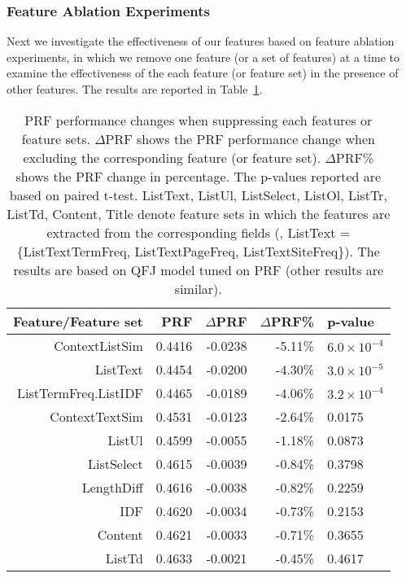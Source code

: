\subsubsection{Feature Ablation Experiments}
Next we investigate the effectiveness of our features based on feature ablation experiments, in which we remove one feature (or a set of features) at a time to examine the effectiveness of the each feature (or feature set) in the presence of other features. The results are reported in Table~\ref{tab:intrinsic-ablation}.
\begin{table}[!ht]
\centering
\caption{PRF performance changes when suppressing each features or feature sets. $\Delta$PRF shows the PRF performance change when excluding the corresponding feature (or feature set). $\Delta$PRF\% shows the PRF change in percentage. The p-values reported are based on paired t-test. ListText, ListUl, ListSelect, ListOl, ListTr, ListTd, Content, Title denote feature sets in which the features are extracted from the corresponding fields (\eg, ListText = \{ListTextTermFreq, ListTextPageFreq, ListTextSiteFreq\}). 
The results are based on QFJ model tuned on PRF (other results are similar).}
\label{tab:intrinsic-ablation}
\begin{tabular}{|r|r|r|r|l|} \hline
Feature/Feature set & PRF & $\Delta$PRF & $\Delta$PRF\% & p-value\\ \hline
ContextListSim & 0.4416 & -0.0238 & -5.11\% & $6.0\times10^{-4}$ \\ \hline
ListText & 0.4454 & -0.0200 & -4.30\% & $3.0\times10^{-5}$ \\ \hline
ListTermFreq.ListIDF & 0.4465 & -0.0189 & -4.06\% & $3.2\times10^{-4}$ \\ \hline
ContextTextSim & 0.4531 & -0.0123 & -2.64\% & 0.0175 \\ \hline
ListUl & 0.4599 & -0.0055 & -1.18\% & 0.0873 \\ \hline
ListSelect & 0.4615 & -0.0039 & -0.84\% & 0.3798 \\ \hline
LengthDiff & 0.4616 & -0.0038 & -0.82\% & 0.2259 \\ \hline
IDF & 0.4620 & -0.0034 & -0.73\% & 0.2153 \\ \hline
Content & 0.4621 & -0.0033 & -0.71\% & 0.3655 \\ \hline
ListTd & 0.4633 & -0.0021 & -0.45\% & 0.4617 \\ \hline

\end{tabular}
\end{table}
